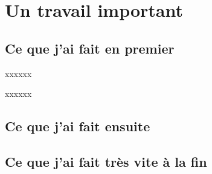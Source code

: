 \chapter{Un travail important}
\minitoc

\section{Ce que j'ai fait en premier}
\blindtext[10]
xxxxxx

\thispagestyle{empty}
xxxxxx
\blindtext[10]


\section{Ce que j'ai fait ensuite}
\blindtext[10]

\section{Ce que j'ai fait très vite à la fin}
\blindtext[10]
